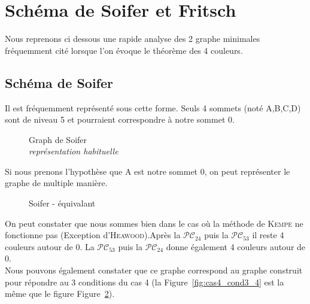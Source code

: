 \documentclass[french]{report}
\begin{document}
\section{Schéma de Soifer et Fritsch}
Nous reprenons ci dessous une rapide analyse des 2 graphe minimales fréquemment cité lorsque l'on évoque le théorème des 4 couleurs.
\subsection{Schéma de Soifer}
Il est fréquemment représenté sous cette forme.
Seuls 4 sommets (noté A,B,C,D) sont de niveau 5 et pourraient correspondre à notre sommet 0.

\begin{figure}[!ht]\centering
		
	\caption{Graph de Soifer\\\footnotesize\textit{représentation habituelle}}\label{fig:soifer}
\end{figure}

Si nous prenons l’hypothèse que A est notre sommet 0, on peut représenter le graphe de multiple manière.
\begin{figure}[!h]\centering
	\begin{changemargin}{-3cm}{-3cm}
		\begin{center}
			
			\hspace{15pt}
			
			\hspace{15pt}
			
		\end{center}
	\end{changemargin}
\end{figure}
\begin{figure}[!h]\centering
	\begin{changemargin}{-3cm}{-3cm}
		\begin{center}
			
			\hspace{15pt}
			
			\hspace{15pt}
			
		\end{center}
	\end{changemargin}
	\begin{changemargin}{1.75cm}{1.75cm}
		\caption{Soifer - équivalant}\label{fig:Soifer_anamorphose}
	\end{changemargin}
\end{figure}
\FloatBarrier

On peut constater que nous sommes bien dans le cas où la méthode de \textsc{Kempe} ne fonctionne pas (Exception d'\textsc{Heawood}).Après la $\mathcal{PC}_{24}$ puis la $\mathcal{PC}_{53}$ il reste 4 couleurs autour de 0.
La $\mathcal{PC}_{53}$ puis la $\mathcal{PC}_{24}$ donne également 4 couleurs autour de 0.\\
Nous pouvons également constater que ce graphe correspond au graphe construit pour répondre au 3 conditions du cas 4 (la  Figure~\ref{fig:cas4_cond3_4} est la même que le figure Figure~\ref{fig:Soifer_anamorphose}). 
\\
\end{document}
